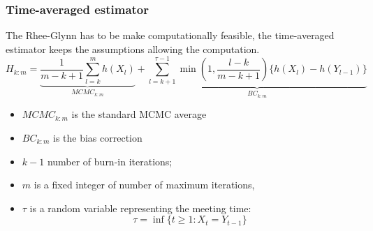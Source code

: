 \documentclass[9pt]{beamer}
\begin{document}
	\begin{frame}
		\frametitle{Time-averaged estimator}
		The Rhee-Glynn has to be make computationally feasible, the time-averaged estimator keeps the assumptions allowing the computation.
		$$
		H_{k:m}
		= \underbrace{
			\frac{1}{m-k+1}\sum_{l=k}^{m}h(X_l) }_{MCMC_{k:m}}
		+ \underbrace{ 
			\sum_{l=k+1}^{\tau -1}\min(1, \frac{l-k}{m-k+1})\{h(X_l)-h(Y_{l-1})\} }_{BC_{k:m}}
		$$ %
		\begin{itemize}
			\item $MCMC_{k:m}$  is the standard MCMC average
			\item $BC_{k:m}$ is the bias correction
		\end{itemize}
		\begin{itemize}
			\item $k-1$ number of burn-in iterations;
			\item $m$ is a fixed integer of number of maximum iterations,
			\item $\tau$ is a random variable representing the meeting time:
			$$ \tau = \inf\{t \geq 1 : X_t = Y_{t-1}\}$$
		\end{itemize}


	
	\end{frame}
\end{document}
